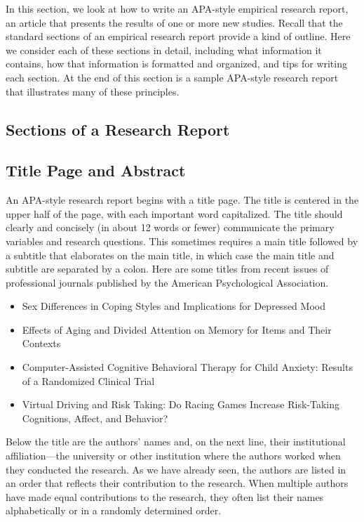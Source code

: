 In this section, we look at how to write an APA-style empirical research report, an article that presents the results of one or more new studies. Recall that the standard sections of an empirical research report provide a kind of outline. Here we consider each of these sections in detail, including what information it contains, how that information is formatted and organized, and tips for writing each section. At the end of this section is a sample APA-style research report that illustrates many of these principles.


\subsection{Sections of a Research Report}

\subsection{Title Page and Abstract}

An APA-style research report begins with a title page. The title is centered in the upper half of the page, with each important word capitalized. The title should clearly and concisely (in about 12 words or fewer) communicate the primary variables and research questions. This sometimes requires a main title followed by a subtitle that elaborates on the main title, in which case the main title and subtitle are separated by a colon. Here are some titles from recent issues of professional journals published by the American Psychological Association.


\begin{itemize}
\item Sex Differences in Coping Styles and Implications for Depressed Mood

\item Effects of Aging and Divided Attention on Memory for Items and Their Contexts

\item Computer-Assisted Cognitive Behavioral Therapy for Child Anxiety: Results of a Randomized Clinical
Trial

\item Virtual Driving and Risk Taking: Do Racing Games Increase Risk-Taking Cognitions, Affect, and
Behavior?

\end{itemize}

Below the title are the authors' names and, on the next line, their institutional affiliation---the university or other institution where the authors worked when they conducted the research. As we have already seen, the authors are listed in an order that reflects their contribution to the research. When multiple authors have made equal contributions to the research, they often list their names alphabetically or in a randomly determined order.



